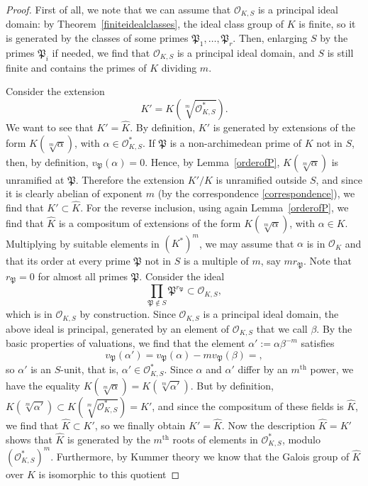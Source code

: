 \documentclass[a4paper, 12pt]{amsart}
\theoremstyle{definition}
\theoremstyle{plain}
\theoremstyle{plain}
\theoremstyle{plain}
\theoremstyle{plain}
\theoremstyle{remark}
\theoremstyle{remark}
\theoremstyle{plain}
\newcommand{\thmref}[1]{Theorem~\ref{#1}}
\newcommand{\lemref}[1]{Lemma~\ref{#1}}
\renewcommand{\P}{\mathfrak{P}}
\begin{document}
	\begin{proof}
		First of all, we note that we can assume that $\mathcal{O}_{K,S}$ is a principal ideal domain: by \thmref{finiteidealclasses}, the ideal class group of $K$ is finite, so it is generated by the classes of some primes $\P_1,\ldots,\P_r$. Then, enlarging $S$ by the primes $\P_i$ if needed, we find that $\mathcal{O}_{K,S}$ is a principal ideal domain, and $S$ is still finite and contains the primes of $K$ dividing $m$.
		
		Consider the extension
		\begin{equation*}
			K'=K\left(\sqrt[m]{\mathcal{O}_{K,S}^*}\right).
		\end{equation*}
		We want to see that $K'=\hat{K}$. By definition, $K'$ is generated by extensions of the form $K(\sqrt[m]{\alpha})$, with $\alpha\in\mathcal{O}_{K,S}^*$. If $\P$ is a non-archimedean prime of $K$ not in $S$, then, by definition, $v_\P(\alpha)=0$. Hence, by \lemref{orderofP}, $K(\sqrt[m]{\alpha})$ is unramified at $\P$. Therefore the extension $K'/K$ is unramified outside $S$, and since it is clearly abelian of exponent $m$ (by the correspondence \eqref{correspondence}), we find that $K'\subset\hat{K}$. For the reverse inclusion, using again \lemref{orderofP}, we find that $\hat{K}$ is a compositum of extensions of the form $K(\sqrt[m]{\alpha})$, with $\alpha\in K$. Multiplying by suitable elements in $(K^*)^m$, we may assume that $\alpha$ is in $\mathcal{O}_K$ and that its order at every prime $\P$ not in $S$ is a multiple of $m$, say $mr_\P$. Note that $r_\P=0$ for almost all primes $\P$. Consider the ideal
		\begin{equation*}
			\prod_{\P\not\in S}\P^{r_\P}\subset\mathcal{O}_{K,S},
		\end{equation*}
		which is in $\mathcal{O}_{K,S}$ by construction. Since $\mathcal{O}_{K,S}$ is a principal ideal domain, the above ideal is principal, generated by an element of $\mathcal{O}_{K,S}$ that we call $\beta$. By the basic properties of valuations, we find that the element $\alpha':=\alpha\beta^{-m}$ satisfies
		\begin{equation*}
			v_{\P}(\alpha')=v_{\P}(\alpha)-mv_{\P}(\beta)=,
		\end{equation*}
		so $\alpha'$ is an $S$-unit, that is, $\alpha'\in\mathcal{O}^*_{K,S}$. Since $\alpha$ and $\alpha'$ differ by an $m^\text{th}$ power, we have the equality $K(\sqrt[m]{\alpha})=K(\sqrt[m]{\alpha'})$. But by definition, $K(\sqrt[m]{\alpha'})\subset K(\sqrt[m]{\mathcal{O}_{K,S}^*})=K'$, and since the compositum of these fields is $\hat{K}$, we find that $\hat{K}\subset K'$, so we finally obtain $K'=\hat{K}$. Now the description $\hat{K}=K'$ shows that $\hat{K}$ is generated by the $m^\text{th}$ roots of elements in $\mathcal{O}_{K,S}^*$, modulo $(\mathcal{O}_{K,S}^*)^m$. Furthermore, by Kummer theory we know that the Galois group of $\hat{K}$ over $K$ is isomorphic to this quotient

\end{proof}
\end{document}

